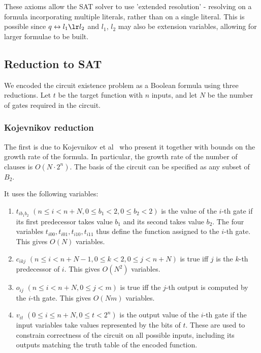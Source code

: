 \documentclass{article}
\begin{document}
These axioms allow the SAT solver to use 'extended resolution' - resolving on a formula incorporating multiple literals, rather than on a single literal. This is possible since $q \leftrightarrow l_1 \lr l_2$ and $l_1$, $l_2$ may also be extension variables, allowing for larger formulae to be built. \cite{krajicek}

\subsection{Reduction to SAT}

We encoded the circuit existence problem as a Boolean formula using three reductions. Let $t$ be the target function with $n$ inputs, and let $N$ be the number of gates required in the circuit.

\subsubsection{Kojevnikov reduction}

The first is due to Kojevnikov et al~\cite{kulikov} who present it together with bounds on the growth rate of the formula. In particular, the growth rate of the number of clauses is $O(N \cdot 2^n)$. The basis of the circuit can be specified as any subset of \(B_2\).

It uses the following variables:

\begin{enumerate}

  \item $t_{ib_1b_2}$ $(n \leq i < n + N, 0 \leq b_1 < 2, 0 \leq b_2 < 2)$ is the value of the $i$-th gate if its first predecessor takes value $b_1$ and its second takes value $b_2$. The four variables $t_{i00}, t_{i01}, t_{i10}, t_{i11}$ thus define the function assigned to the $i$-th gate. This gives $O(N)$ variables.
  \item $c_{ikj}$ $(n \leq i < n + N - 1, 0 \leq k < 2, 0 \leq j < n + N)$ is true iff $j$ is the $k$-th predecessor of $i$. This gives $O(N^2)$ variables.
  \item $o_{ij}$ $(n \leq i < n + N, 0 \leq j < m)$ is true iff the $j$-th output is computed by the $i$-th gate. This gives $O(Nm)$ variables.
  \item $v_{it}$ $(0 \leq i \leq n + N, 0 \leq t < 2^n)$ is the output value of the $i$-th gate if the input variables take values represented by the bits of $t$. These are used to constrain correctness of the circuit on all possible inputs, including its outputs matching the truth table of the encoded function.

\end{enumerate}
\end{document}
